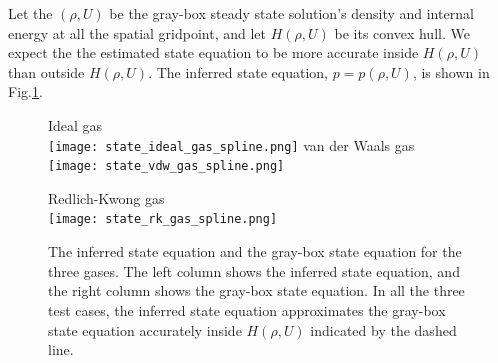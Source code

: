 \documentclass{paper1}
\begin{document}
Let the $(\rho, U)$ be the gray-box steady state solution's 
density and internal energy at all the spatial
gridpoint, and let $H(\rho, U)$ be its convex hull. We expect the the estimated state equation
to be more accurate inside $H(\rho, U)$ than outside $H(\rho, U)$.
The inferred state equation, $p = p(\rho, U)$, is shown in Fig.\ref{fig:NS state eqn}.
\clearpage
\begin{figure}
\begin{center}
    Ideal gas\\
    \texttt{[image: state\_ideal\_gas\_spline.png]}
    van der Waals gas\\
    \texttt{[image: state\_vdw\_gas\_spline.png]}
\end{center}
\end{figure}

\begin{figure}
\begin{center}
    Redlich-Kwong gas\\
    \texttt{[image: state\_rk\_gas\_spline.png]}
    \caption{
    \label{fig:NS state eqn}
    The inferred state equation and the gray-box state equation for the three gases. 
    The left column shows the inferred state equation, and the right column shows the 
    gray-box state equation.
    In all the three test cases, the inferred state equation approximates the gray-box state
    equation accurately inside $H(\rho, U)$ indicated by the dashed line.}
\end{center}
\end{figure}
\end{document}
